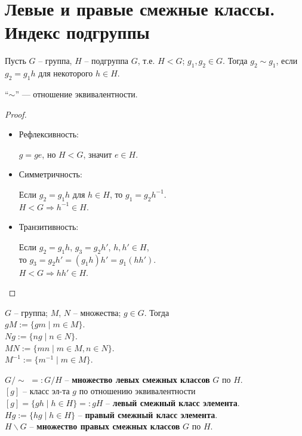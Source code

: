 \section{Левые и правые смежные классы. Индекс подгруппы}
\begin{conj}
    Пусть $G$ -- группа, $H$ -- подгруппа $G$, т.е. $H < G$;
    $g_1, g_2 \in G$. Тогда $g_2 \sim g_1$, если $g_2 = g_1 h$ для
    некоторого $h \in H$.
\end{conj}

\begin{theorem-non}
    ``$\sim$'' --- отношение эквивалентности.
\end{theorem-non}
\begin{proof} $ $

    \begin{itemize}
        \item Рефлексивность:
        
        $g = ge$, но $H < G$, значит $e \in H$.

        \item Симметричность:
        
        Если $g_2 = g_1 h$ для $h \in H$, то $g_1 = g_2 h^{-1}$. \\
        $H < G \Rightarrow h^{-1} \in H$.

        \item Транзитивность:
        
        Если $g_2 = g_1 h$, $g_3 = g_2 h'$, $h, h' \in H$, \\
        то $g_3 = g_2 h' = (g_1 h) h' = g_1 (hh')$. \\
        $H < G \Rightarrow hh' \in H$.

    \end{itemize}
\end{proof}

\begin{conj} \quad

    $G$ -- группа; $M$, $N$ -- множества; $g \in G$. Тогда \\
    $gM := \{ gm \mid m \in M \}$. \\
    $Ng := \{ ng \mid n \in N \}$. \\
    $MN := \{ mn \mid m \in M, n \in N \}$. \\
    $M^{-1} := \{ m^{-1} \mid m \in M \}$.
\end{conj}

\begin{conj} \quad 

    $G/\sim \,\, =: G/H$ -- 
    \textbf{множество левых смежных классов} $G$ по $H$. \\
    $[g]$ -- класс эл-та $g$ по отношению эквивалентности \\
    $[g] = \{ gh \mid h \in H \} =: gH$ -- 
    \textbf{левый смежный класс элемента}. \\
    $Hg := \{ hg \mid h \in H \}$ -- 
    \textbf{правый смежный класс элемента}. \\
    $H \backslash G$ -- \textbf{множество правых 
    смежных классов} $G$ по $H$. \\
\end{conj}

